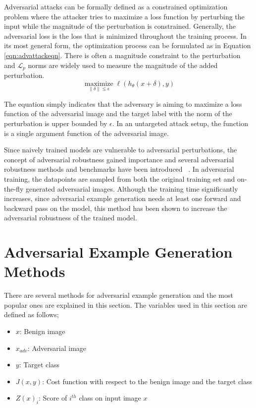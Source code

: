 Adversarial attacks can be formally defined as a constrained optimization problem where the attacker tries to maximize a loss function by perturbing the input while the magnitude of the perturbation is constrained. Generally, the adversarial loss is the loss that is minimized throughout the training process. In its most general form, the optimization process can be formulated as in Equation \ref{eqn:advattackeqn}. There is often a magnitude constraint to the perturbation and \(\mathcal{L}_p\) norms are widely used to measure the magnitude of the added perturbation. 
\begin{equation}
    \label{eqn:advattackeqn}
    \underset{\|\delta\| \leq \epsilon}{\operatorname{maximize}} \ell\left(h_{\theta}(x+\delta), y\right)
\end{equation}

The equation simply indicates that the adversary is aiming to maximize a loss function of the adversarial image and the target label with the norm of the perturbation is upper bounded by \(\epsilon\). In an untargeted attack setup, the function is a single argument function of the adversarial image.

Since naively trained models are vulnerable to adversarial perturbations, the concept of adversarial robustness gained importance and several adversarial robustness methods and benchmarks have been introduced ~\cite{madry2017towards,shafahi2019adversarial,shafahi2018adversarial,tramer2017ensemble,ross2018improving}. In adversarial training, the datapoints are sampled from both the original training set and on-the-fly generated adversarial images. Although the training time significantly increases, since adversarial example generation needs at least one forward and backward pass on the model, this method has been shown to increase the adversarial robustness of the trained model. 

\section{Adversarial Example Generation Methods}\label{section:methods}
There are several methods for adversarial example generation and the most popular ones are explained in this section. The variables used in this section are defined as follows;
\begin{itemize}
    \item \(x\): Benign image
    \item \(x_{adv}\): Adversarial image
    \item \(y\): Target class
    \item \(J(x, y)\): Cost function with respect to the benign image and the target class
    \item \(Z(x)_i\): Score of $i^{th}$ class on input image \(x\)
\end{itemize}

